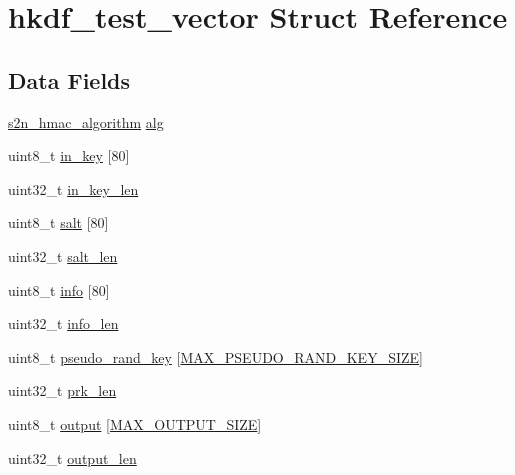\hypertarget{structhkdf__test__vector}{}\section{hkdf\+\_\+test\+\_\+vector Struct Reference}
\label{structhkdf__test__vector}
\subsection*{Data Fields}
\begin{DoxyCompactItemize}
\item 
\hyperlink{s2n__hmac_8h_a05e34c658a0066b52f746b931d53dbf8}{s2n\+\_\+hmac\+\_\+algorithm} \hyperlink{structhkdf__test__vector_ae2daecd156006e6cf5c5800a7293628c}{alg}
\item 
uint8\+\_\+t \hyperlink{structhkdf__test__vector_a8d746c85ffd247aeb96e29e45c20f94b}{in\+\_\+key} \mbox{[}80\mbox{]}
\item 
uint32\+\_\+t \hyperlink{structhkdf__test__vector_ae4d3be84b6200c352c5df57bba47318e}{in\+\_\+key\+\_\+len}
\item 
uint8\+\_\+t \hyperlink{structhkdf__test__vector_abc17a7721bf086ccd67438bbf98a6dd8}{salt} \mbox{[}80\mbox{]}
\item 
uint32\+\_\+t \hyperlink{structhkdf__test__vector_ae83f31f92af369e96c05df96c88d07aa}{salt\+\_\+len}
\item 
uint8\+\_\+t \hyperlink{structhkdf__test__vector_aa62dace5a347bb15b58f40c6bb176488}{info} \mbox{[}80\mbox{]}
\item 
uint32\+\_\+t \hyperlink{structhkdf__test__vector_a5d731d05384f812f4a53d5e254d9af21}{info\+\_\+len}
\item 
uint8\+\_\+t \hyperlink{structhkdf__test__vector_aa1c8395b21f400e367891c731063d2b9}{pseudo\+\_\+rand\+\_\+key} \mbox{[}\hyperlink{s2n__hkdf__test_8c_ae0c24c56d2a1fb1fcec4475dbd8dc05f}{M\+A\+X\+\_\+\+P\+S\+E\+U\+D\+O\+\_\+\+R\+A\+N\+D\+\_\+\+K\+E\+Y\+\_\+\+S\+I\+ZE}\mbox{]}
\item 
uint32\+\_\+t \hyperlink{structhkdf__test__vector_ab2af0084520eaeac6ed5d0fe2bad1b96}{prk\+\_\+len}
\item 
uint8\+\_\+t \hyperlink{structhkdf__test__vector_ad90e7e2e9491902d6b4f4ebbce6c56b1}{output} \mbox{[}\hyperlink{s2n__hkdf__test_8c_a28d683cf067736d76f867f30c066317e}{M\+A\+X\+\_\+\+O\+U\+T\+P\+U\+T\+\_\+\+S\+I\+ZE}\mbox{]}
\item 
uint32\+\_\+t \hyperlink{structhkdf__test__vector_a050d5038dbe2b4ba61d06c8a5b89382a}{output\+\_\+len}
\end{DoxyCompactItemize}


